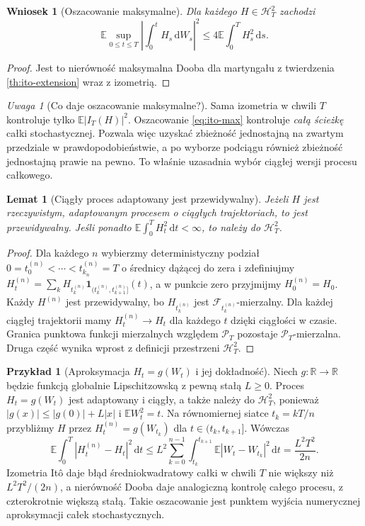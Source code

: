 \documentclass[11pt,a4paper,oneside]{report}
\numberwithin{equation}{chapter}
\theoremstyle{plain}
\newtheorem{lemat}[twierdzenie]{Lemat}
\newtheorem{wniosek}[twierdzenie]{Wniosek}
\theoremstyle{definition}
\newtheorem{przyklad}{Przykład}[chapter]
\theoremstyle{remark}
\newtheorem{uwaga}{Uwaga}[chapter]
\newcommand{\R}{\mathbb{R}}
\newcommand{\E}{\mathbb{E}}
\newcommand{\calF}{\mathcal{F}}
\newcommand{\calH}{\mathcal{H}}
\newcommand{\calP}{\mathcal{P}}
\newcommand{\ind}[1]{\mathbf{1}_{#1}}
\newcommand{\dd}{\mathrm{d}}
\begin{document}
\begin{wniosek}[Oszacowanie maksymalne]\label{cor:volIII:02:01}
Dla każdego $H\in\calH_T^2$ zachodzi
\[
\E\sup_{0\le t\le T}\left|\int_0^tH_s\,\dd W_s\right|^2
\le4\E\int_0^TH_s^2\,\dd s.
\tag{2.9}\label{eq:ito-max}
\]
\end{wniosek}
\begin{proof}
Jest to nierówność maksymalna Dooba dla martyngału
z twierdzenia \ref{th:ito-extension} wraz z izometrią.
\end{proof}

\begin{uwaga}[Co daje oszacowanie maksymalne?]
Sama izometria w chwili $T$ kontroluje tylko
$\E|I_T(H)|^2$. Oszacowanie \eqref{eq:ito-max}
kontroluje \emph{całą ścieżkę} całki stochastycznej.
Pozwala więc uzyskać zbieżność jednostajną na zwartym
przedziale w prawdopodobieństwie, a po wyborze podciągu
również zbieżność jednostajną prawie na pewno. To właśnie
uzasadnia wybór ciągłej wersji procesu całkowego.
\end{uwaga}


\begin{lemat}[Ciągły proces adaptowany jest przewidywalny]\label{lem:volIII:02:03}
Jeżeli $H$ jest rzeczywistym, adaptowanym procesem
o ciągłych trajektoriach, to jest przewidywalny.
Jeśli ponadto $\E\int_0^TH_t^2\,\dd t<\infty$,
to należy do $\calH_T^2$.
\end{lemat}
\begin{proof}
Dla każdego $n$ wybierzmy deterministyczny podział
$0=t_0^{(n)}<\cdots<t_{k_n}^{(n)}=T$ o średnicy
dążącej do zera i zdefiniujmy
$H_t^{(n)}=\sum_k H_{t_k^{(n)}}
\ind{(t_k^{(n)},t_{k+1}^{(n)}]}(t)$,
a w punkcie zero przyjmijmy $H_0^{(n)}=H_0$.
Każdy $H^{(n)}$ jest przewidywalny, bo
$H_{t_k^{(n)}}$ jest $\calF_{t_k^{(n)}}$-mierzalny.
Dla każdej ciągłej trajektorii mamy
$H_t^{(n)}\to H_t$ dla każdego $t$ dzięki
ciągłości w czasie. Granica punktowa funkcji
mierzalnych względem $\calP_T$ pozostaje
$\calP_T$-mierzalna. Druga część wynika wprost
z definicji przestrzeni $\calH_T^2$.
\end{proof}

\begin{przyklad}[Aproksymacja $H_t=g(W_t)$ i jej dokładność]
Niech $g:\R\to\R$ będzie funkcją globalnie Lipschitzowską
z pewną stałą $L\ge0$. Proces $H_t=g(W_t)$ jest
adaptowany i ciągły, a także należy do $\calH_T^2$,
ponieważ $|g(x)|\le|g(0)|+L|x|$ i
$\E W_t^2=t$. Na równomiernej siatce $t_k=kT/n$
przybliżmy $H$ przez
$H_t^{(n)}=g(W_{t_k})$ dla $t\in(t_k,t_{k+1}]$.
Wówczas
\[
\E\int_0^T|H_t^{(n)}-H_t|^2\,\dd t
\le L^2\sum_{k=0}^{n-1}\int_{t_k}^{t_{k+1}}
\E|W_t-W_{t_k}|^2\,\dd t
=\frac{L^2T^2}{2n}.
\]
Izometria Itô daje błąd średniokwadratowy całki
w chwili $T$ nie większy niż $L^2T^2/(2n)$,
a nierówność Dooba daje analogiczną kontrolę
całego procesu, z czterokrotnie większą stałą.
Takie oszacowanie jest punktem wyjścia
numerycznej aproksymacji całek stochastycznych.
\end{przyklad}
\end{document}
